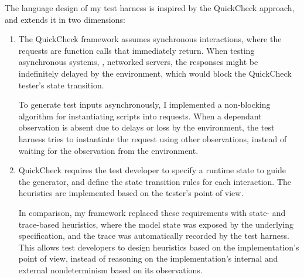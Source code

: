 The language design of my test harness is inspired by the QuickCheck approach,
and extends it in two dimensions:
\begin{enumerate}
\item The QuickCheck framework assumes synchronous interactions, where the
  requests are function calls that immediately return.  When testing
  asynchronous systems, \eg, networked servers, the responses might be
  indefinitely delayed by the environment, which would block the QuickCheck
  tester's state transition.
  
  To generate test inputs asynchronously, I implemented a non-blocking algorithm
  for instantiating scripts into requests.  When a dependant observation is
  absent due to delays or loss by the environment, the test harness tries to
  instantiate the request using other observations, instead of waiting for the
  observation from the environment.

\item QuickCheck requires the test developer to specify a runtime state to guide
  the generator, and define the state transition rules for each interaction.
  The heuristics are implemented based on the tester's point of view.

  In comparison, my framework replaced these requirements with state- and
  trace-based heuristics, where the model state was exposed by the underlying
  specification, and the trace was automatically recorded by the test harness.
  This allows test developers to design heuristics based on the implementation's
  point of view, instead of reasoning on the implementation's internal and
  external nondeterminism based on its observations.
\end{enumerate}
